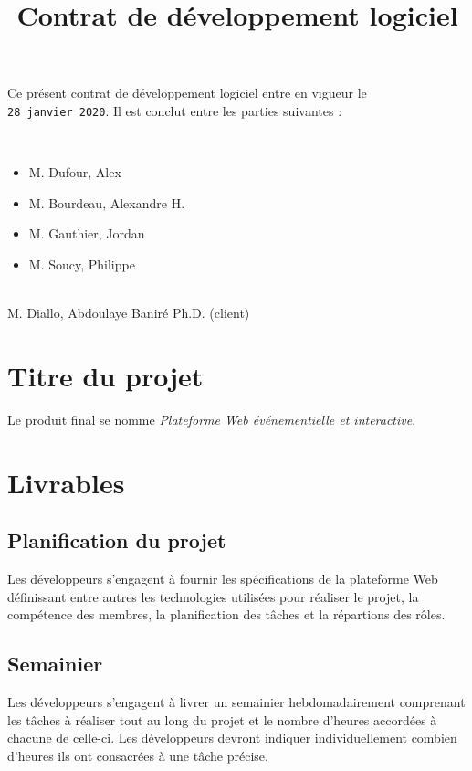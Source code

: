 \documentclass[letter,12pt]{exam}
\title{Contrat de développement logiciel\\}
\date{}
\begin{document}
\maketitle

Ce présent contrat de développement logiciel entre en vigueur le
\texttt{28\ janvier\ 2020}. Il est conclut entre les parties suivantes :

\vspace{0.5cm}
\\

\begin{itemize}
\item[]  M. Dufour, Alex
\item[]  M. Bourdeau, Alexandre H.
\item[]  M. Gauthier, Jordan
\item[]  M. Soucy, Philippe
\end{itemize}

\vspace{0.5cm}
\\

M. Diallo, Abdoulaye Baniré
Ph.D. (client)


\section{Titre du projet}

Le produit final se nomme \emph{Plateforme Web événementielle et interactive}.


\section{Livrables}

\subsection{Planification du projet}

Les développeurs s'engagent à fournir les spécifications de la
plateforme Web définissant entre autres les technologies utilisées pour
réaliser le projet, la compétence des membres, la planification des
tâches et la répartions des rôles.

\subsection{Semainier}

Les développeurs s'engagent à livrer un semainier hebdomadairement
comprenant les tâches à réaliser tout au long du projet et le nombre
d'heures accordées à chacune de celle-ci. Les développeurs devront
indiquer individuellement combien d'heures ils ont consacrées à une tâche
précise.
\end{document}

